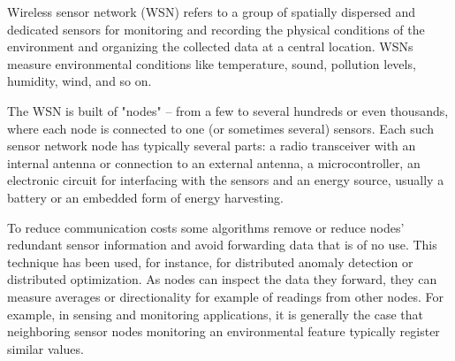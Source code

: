 
Wireless sensor network (WSN) refers to a group of spatially dispersed and dedicated sensors for monitoring and recording the physical conditions of the environment and organizing the collected data at a central location. WSNs measure environmental conditions like temperature, sound, pollution levels, humidity, wind, and so on.
\smallskip

The WSN is built of "nodes" – from a few to several hundreds or even thousands, where each node is connected to one (or sometimes several) sensors. Each such sensor network node has typically several parts: a radio transceiver with an internal antenna or connection to an external antenna, a microcontroller, an electronic circuit for interfacing with the sensors and an energy source, usually a battery or an embedded form of energy harvesting.
\smallskip

To reduce communication costs some algorithms remove or reduce nodes' redundant sensor information and avoid forwarding data that is of no use. This technique has been used, for instance, for distributed anomaly detection or distributed optimization. As nodes can inspect the data they forward, they can measure averages or directionality for example of readings from other nodes. For example, in sensing and monitoring applications, it is generally the case that neighboring sensor nodes monitoring an environmental feature typically register similar values.
\smallskip






